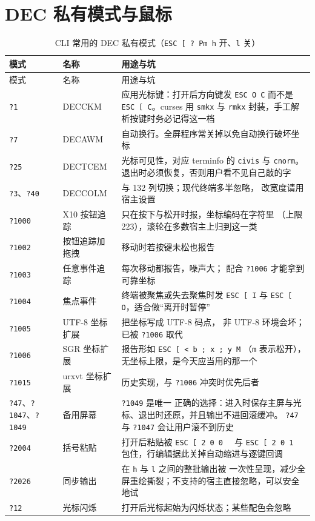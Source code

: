 \documentclass[12pt,a4paper,fontset=fandol]{ctexbook}
\newcommand{\Tp}[1]{\texttt{#1}}
\begin{document}
\section{DEC 私有模式与鼠标}

\begin{longtable}{@{}>{\raggedright\arraybackslash}p{}
                 >{\raggedright\arraybackslash}p{}
                 >{\raggedright\arraybackslash}p{}@{}}
\caption{CLI 常用的 DEC 私有模式（\Tp{ESC [ ? Pm h} 开、\Tp{l} 关）}
\label{tab:decpriv} \\
\toprule
模式 & 名称 & 用途与坑 \\
\midrule
\endfirsthead
\toprule
模式 & 名称 & 用途与坑 \\
\midrule
\endhead
\Tp{?1} & DECCKM & 应用光标键：打开后方向键发
\Tp{ESC O C} 而不是 \Tp{ESC [ C}。curses 用 \Tp{smkx} 与 \Tp{rmkx}
封装，手工解析按键时务必记得这一档 \\
\Tp{?7} & DECAWM & 自动换行。全屏程序常关掉以免自动换行破坏坐标 \\
\Tp{?25} & DECTCEM & 光标可见性，对应 terminfo 的 \Tp{civis} 与
\Tp{cnorm}。退出时必须恢复，否则用户看不见自己敲的字 \\
\Tp{?3}、\Tp{?40} & DECCOLM & 80 与 132 列切换；现代终端多半忽略，
改宽度请用宿主设置 \\
\Tp{?1000} & X10 按钮追踪 & 只在按下与松开时报，坐标编码在字符里
（上限 223），滚轮在多数宿主上归到这一类 \\
\Tp{?1002} & 按钮追踪加拖拽 & 移动时若按键未松也报告 \\
\Tp{?1003} & 任意事件追踪 & 每次移动都报告，噪声大；
配合 \Tp{?1006} 才能拿到可靠坐标 \\
\Tp{?1004} & 焦点事件 & 终端被聚焦或失去聚焦时发 \Tp{ESC [ I} 与
\Tp{ESC [ O}，适合做``离开时暂停'' \\
\Tp{?1005} & UTF-8 坐标扩展 & 把坐标写成 UTF-8 码点，
非 UTF-8 环境会坏；已被 \Tp{?1006} 取代 \\
\Tp{?1006} & SGR 坐标扩展 & 报告形如 \Tp{ESC [ < b ; x ; y M}
（\Tp{m} 表示松开），无坐标上限，是今天应当用的那一个 \\
\Tp{?1015} & urxvt 坐标扩展 & 历史实现，与 \Tp{?1006} 冲突时优先后者 \\
\Tp{?47}、\Tp{?1047}、\Tp{?1049} & 备用屏幕 & \Tp{?1049} 是唯一
正确的选择：进入时保存主屏与光标、退出时还原，并且输出不进回滚缓冲。
\Tp{?47} 与 \Tp{?1047} 会让用户滚不到历史 \\
\Tp{?2004} & 括号粘贴 & 打开后粘贴被 \Tp{ESC [ 2 0 0 ~} 与
\Tp{ESC [ 2 0 1 ~} 包住，行编辑据此关掉自动缩进与逐键回调 \\
\Tp{?2026} & 同步输出 & 在 \Tp{h} 与 \Tp{l} 之间的整批输出被
一次性呈现，减少全屏重绘撕裂；不支持的宿主直接忽略，可以安全地试 \\
\Tp{?12} & 光标闪烁 & 打开后光标起始为闪烁状态；某些配色会忽略 \\
\bottomrule
\end{longtable}
\end{document}
